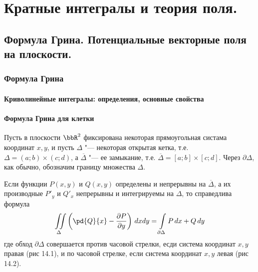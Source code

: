 \part[Кратные интегралы и теория поля.]{Кратные интегралы и теория поля.}%

\chapter{Формула Грина. Потенциальные векторные поля на плоскости.}
\section{Формула Грина} 

\subsection{Криволинейные интегралы: определения, основные свойства}

\subsection{Формула Грина для клетки}

Пусть в плоскости $\bbR^2$ фиксирована некоторая прямоугольная систама координат $x,y$, и пусть $\Delta$ "--- некоторая открытая кетка, т.е. $\Delta = (a;b)\times(c;d)$, а $\overline{\Delta}$ "--- ее замыкание, т.е. $\overline{\Delta}=[a;b]\times[c;d]$. Через $\partial \Delta$, как обычно, обозначим границу множества $\Delta$.


\begin{lemm}
Если функции $P(x,y)$ и $Q(x,y)$ определены и непрерывны на $\overline{\Delta}$, а их производные $P'_y$ и $Q'_x$ непрерывны и интегрируемы на $\Delta$, то справедлива формула
\begin{equation} \label{Grin}
\iint\limits_{\Delta} \left( \pd{Q}{x}-\frac{\partial P}{\partial y} \right)\,dxdy = \int\limits_{\partial \Delta} P\,dx + Q\,dy
\end{equation}
где обход $\partial\Delta$ совершается против часовой стрелки, есди система координат $x,y$ правая (рис 14.1), и по часовой стрелке, если система координат $x,y$ левая (рис 14.2).
\end{lemm}

